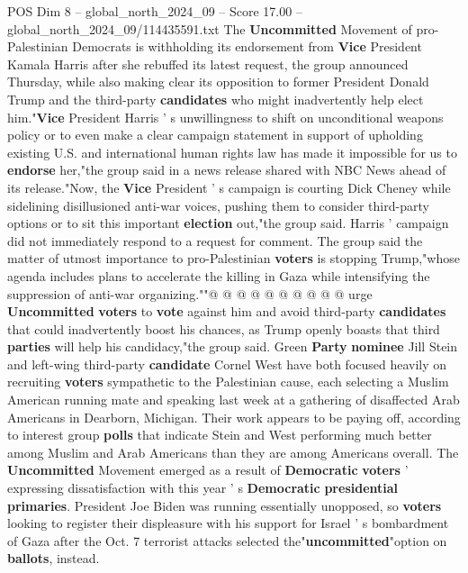 \begin{textsample}{POS Dim 8 – global\_north\_2024\_09 – Score 17.00 – global\_north\_2024\_09/114435591.txt}  \label{ex:f8_pos_082}
The \textbf{Uncommitted} Movement of pro-Palestinian Democrats is withholding its endorsement from \textbf{Vice} President Kamala Harris after she rebuffed its latest request, the group announced Thursday, while also making clear its opposition to former President Donald Trump and the third-party \textbf{candidates} who might inadvertently help elect him."\textbf{Vice} President Harris ' s unwillingness to shift on unconditional weapons policy or to even make a clear campaign statement in support of upholding existing U.S. and international human rights law has made it impossible for us to \textbf{endorse} her,"the group said in a news release shared with NBC News ahead of its release."Now, the \textbf{Vice} President ' s campaign is courting Dick Cheney while sidelining disillusioned anti-war voices, pushing them to consider third-party options or to sit this important \textbf{election} out,"the group said.
Harris ' campaign did not immediately respond to a request for comment.
The group said the matter of utmost importance to pro-Palestinian \textbf{voters} is stopping Trump,"whose agenda includes plans to accelerate the killing in Gaza while intensifying the suppression of anti-war organizing.""@ @ @ @ @ @ @ @ @ @ urge \textbf{Uncommitted} \textbf{voters} to \textbf{vote} against him and avoid third-party \textbf{candidates} that could inadvertently boost his chances, as Trump openly boasts that third \textbf{parties} will help his candidacy,"the group said.
Green \textbf{Party} \textbf{nominee} Jill Stein and left-wing third-party \textbf{candidate} Cornel West have both focused heavily on recruiting \textbf{voters} sympathetic to the Palestinian cause, each selecting a Muslim American running mate and speaking last week at a gathering of disaffected Arab Americans in Dearborn, Michigan.
Their work appears to be paying off, according to interest group \textbf{polls} that indicate Stein and West performing much better among Muslim and Arab Americans than they are among Americans overall.
The \textbf{Uncommitted} Movement emerged as a result of \textbf{Democratic} \textbf{voters} ' expressing dissatisfaction with this year ' s \textbf{Democratic} \textbf{presidential} \textbf{primaries}.
President Joe Biden was running essentially unopposed, so \textbf{voters} looking to register their displeasure with his support for Israel ' s bombardment of Gaza after the Oct. 7 terrorist attacks selected the"\textbf{uncommitted}"option on \textbf{ballots}, instead.

\end{textsample}
